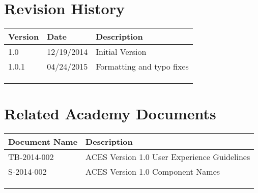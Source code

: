 \prelimsectionformat	%
\chapter{Revision History}

\begin{tabularx}{\linewidth}{|l|l|X|}
    \hline
    Version & Date & Description \\ \hline
    1.0     & 12/19/2014     & Initial Version      \\ \hline
    1.0.1   & 04/24/2015     & Formatting and typo fixes \\ \hline
            &      &             \\ \hline
            &      &             \\ \hline
            &      &             \\ \hline
\end{tabularx}

\vspace{0.25in} %
\chapter{Related Academy Documents} %
\begin{tabularx}{\linewidth}{|l|X|}
    \hline
    Document Name & Description \\ \hline
    TB-2014-002  & ACES Version 1.0 User Experience Guidelines \\ \hline
    S-2014-002  & ACES Version 1.0 Component Names \\ \hline
    & \\ \hline
    & \\ \hline
    & \\ \hline
\end{tabularx}